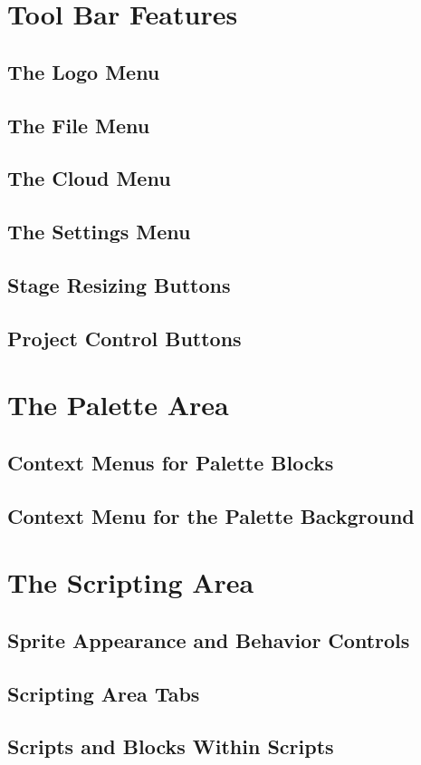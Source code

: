 \documentclass[a4paper]{report}
\begin{document}
\section{Tool Bar Features}
\subsection{The \Snap{} Logo Menu}
\subsection{The File Menu}
\subsection{The Cloud Menu}
\subsection{The Settings Menu}
\subsection{Stage Resizing Buttons}
\subsection{Project Control Buttons}
\section{The Palette Area}
\subsection{Context Menus for Palette Blocks}
\subsection{Context Menu for the Palette Background}
\section{The Scripting Area}
\subsection{Sprite Appearance and Behavior Controls}
\subsection{Scripting Area Tabs}
\subsection{Scripts and Blocks Within Scripts}
\end{document}
